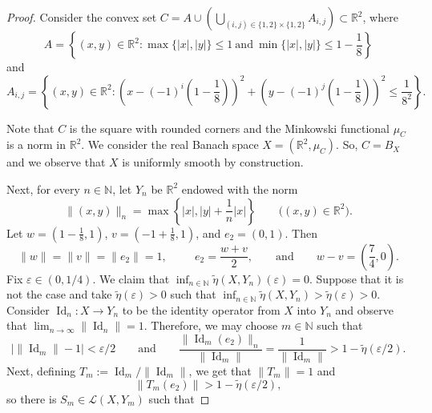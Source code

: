 \documentclass[a4paper,10pt]{amsart}
\theoremstyle{plain}
\theoremstyle{definition}
\DeclareMathOperator{\Id}{\mathrm{Id}}
\newcommand{\R}{\mathbb{R}}
\newcommand{\N}{\mathbb{N}}
\newcommand{\eps}{\varepsilon}
\renewcommand{\leq}{\leqslant}
\begin{document}
\begin{proof}
Consider the convex set $C=A\cup \left( \bigcup_{(i,j)\in \{1,2\}\times \{1,2\}} A_{i,j}\right) \subset \R^2$, where
\begin{equation*}
A=\left\{ (x,y)\in \R^2\colon \max\{ |x|, |y|\} \leq 1 \  \text{and} \   \min \{ |x|, |y| \} \leq 1 - \frac{1}{8} \right\}
\end{equation*}
and
\begin{equation*}
A_{i,j}= \left\{ (x,y)\in \R^2\colon \left( x - (-1)^i \left(1 - \frac{1}{8} \right) \right)^2 + \left( y - (-1)^j \left(1 - \frac{1}{8} \right) \right)^2 \leq \frac{1}{8^2} \right\}.
\end{equation*}

Note that $C$ is the square with rounded corners and the Minkowski functional $\mu_C$ is a norm in $\R^2$. We consider the real Banach space $X = (\R^2, \mu_C)$. So, $C = B_X$ and we observe that $X$ is uniformly smooth by construction.

Next, for every $n\in \N$, let $Y_n$ be $\R^2$ endowed with the norm
\begin{equation*}
\|(x, y)\|_n = \max \left\{ |x|, |y| + \frac{1}{n}|x| \right\} \qquad \bigl((x, y) \in \R^2\bigr).
\end{equation*}
Let $w = \left(1 - \frac{1}{8}, 1\right)$, $v =\left(-1 + \frac{1}{8}, 1\right)$, and $e_2=(0,1)$. Then
\begin{equation*}
\|w\|=\|v\|=\|e_2\|=1, \qquad\ \	e_2 = \frac{w + v}{2}, \qquad \text{and} \qquad w - v =  \left(\frac{7}{4},0\right).
\end{equation*}
Fix $\eps\in (0,1/4)$. We claim that $\inf_{n \in \N} \tilde\eta(X, Y_n)(\eps) = 0$. Suppose that it is not the case and take $\tilde\eta(\eps) > 0$ such that $\inf_{n \in \N} \tilde\eta(X, Y_n) > \tilde\eta(\eps) > 0$. Consider $\Id_n: X \longrightarrow Y_n$ to be the identity operator from $X$ into $Y_n$ and observe that
$\lim_{n\to \infty}\|\Id_n\|=1$. Therefore, we may choose $m\in \N$ such that
\begin{equation*}
\bigl|\|\Id_m\|-1\bigr|<\eps/2 \qquad \text{and} \qquad \frac{\|\Id_{m}(e_2)\|_n}{\|\Id_m\|}=\frac{1}{\|\Id_m\|} > 1 - \tilde\eta(\eps/2).
\end{equation*}
Next, defining $T_m:=\Id_m/\|\Id_m\|$, we get that $\|T_m\|=1$ and
$$
\|T_m(e_2)\|>1-\tilde\eta(\eps/2),
$$
so there is $S_m\in \mathcal{L}(X, Y_{m})$ such that


\end{proof}
\end{document}
